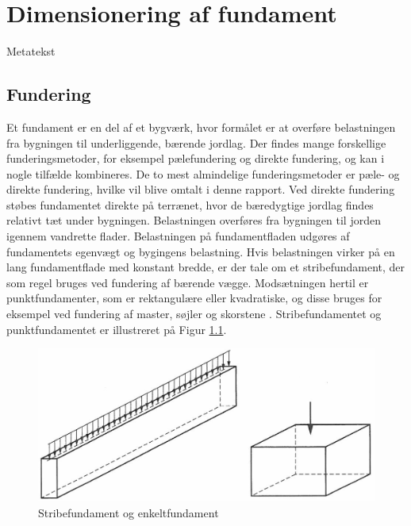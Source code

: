 \chapter{Dimensionering af fundament}

Metatekst 

\section{Fundering}
Et fundament er en del af et bygværk, hvor formålet er at overføre belastningen fra bygningen til underliggende, bærende jordlag. Der findes mange forskellige funderingsmetoder, for eksempel pælefundering og direkte fundering, og kan i nogle tilfælde kombineres. De to mest almindelige funderingsmetoder er pæle- og direkte fundering, hvilke vil blive omtalt i denne rapport.
\newline \indent{     }  Ved direkte fundering støbes fundamentet direkte på terrænet, hvor de bæredygtige jordlag findes relativt tæt under bygningen. Belastningen overføres fra bygningen til jorden igennem vandrette flader. Belastningen på fundamentfladen udgøres af fundamentets egenvægt og bygingens belastning. Hvis belastningen virker på en lang fundamentflade med konstant bredde, er der tale om et stribefundament, der som regel bruges ved fundering af bærende vægge. Modsætningen hertil er punktfundamenter, som er rektangulære eller kvadratiske, og disse bruges for eksempel ved fundering af master, søjler og skorstene \citep[ s. 221]{geoteknik}. Stribefundamentet og punktfundamentet er illustreret på Figur \ref{fig:fundament}. 

\begin{figure}[htbp] \centering
	\begin{minipage}[b]{0.48\textwidth}\centering
		\includegraphics[width=1.0\textwidth]{billeder/fundament.png}
		\caption{Stribefundament og enkeltfundament \citep[ s. 221]{geoteknik}}
		\label{fig:fundament}
	\end{minipage}\hfill
\end{figure}

